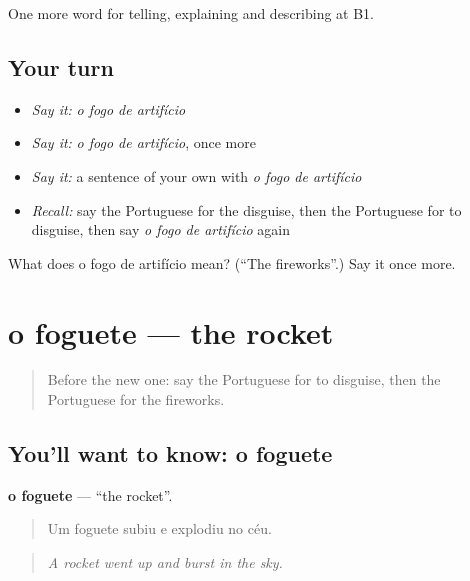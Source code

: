 \begin{grammarlens}[title={What you've built}]
One more word for telling, explaining and describing at B1.
\end{grammarlens}

\subsection*{Your turn}
\begin{itemize}
\raggedright
  \item \emph{Say it:} \emph{o fogo de artifício}
  \item \emph{Say it:} \emph{o fogo de artifício}, once more
  \item \emph{Say it:} a sentence of your own with \emph{o fogo de artifício}
  \item \emph{Recall:} say the Portuguese for the disguise, then the Portuguese for to disguise, then say \emph{o fogo de artifício} again
\end{itemize}

\begin{tcolorbox}[breakable,colback=teal!4,colframe=teal!35!black,title={Before you move on}]
What does o fogo de artifício mean? (\textquotedblleft{}The fireworks\textquotedblright{}.) Say it once more.
\end{tcolorbox}
\section[o foguete]{o foguete — the rocket}

\label{lesson:PT-C322-foguete}



\begin{quote}
Before the new one: say the Portuguese for to disguise, then the Portuguese for the fireworks.
\end{quote}

\subsection*{You'll want to know: o foguete}
\textbf{o foguete} — \textquotedblleft{}the rocket\textquotedblright{}.

\begin{quote}
Um foguete subiu e explodiu no céu.
\end{quote}

\begin{quote}
\emph{A rocket went up and burst in the sky.}
\end{quote}

